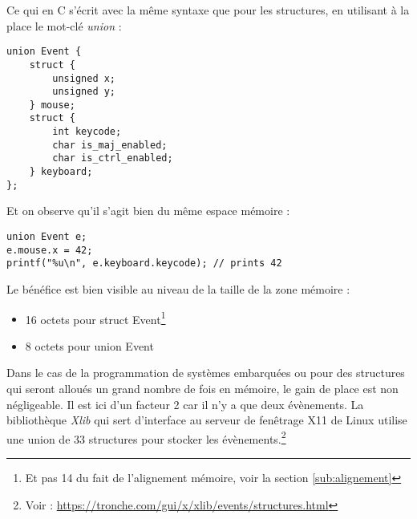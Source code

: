\documentclass[../../../main.tex]{subfiles}
\begin{document}
\begin{minipage}{\textwidth}
	\begin{center}
		
	\end{center}
\end{minipage}

Ce qui en C s’écrit avec la même syntaxe que pour les structures, en utilisant à la place le mot-clé
\textit{union} :
\begin{verbatim}
union Event {
	struct {
		unsigned x;
		unsigned y;
	} mouse;
	struct {
		int keycode;
		char is_maj_enabled;
		char is_ctrl_enabled;
	} keyboard;
};
\end{verbatim}
Et on observe qu’il s’agit bien du même espace mémoire :
\begin{verbatim}
union Event e;
e.mouse.x = 42;
printf("%u\n", e.keyboard.keycode); // prints 42
\end{verbatim}
Le bénéfice est bien visible au niveau de la taille de la zone mémoire :
\begin{itemize}
	\item 16 octets pour \textsf{struct Event}\footnote{Et pas 14 du fait de l’alignement mémoire, voir la section \ref{sub:alignement}}
	\item 8 octets pour \textsf{union Event}
\end{itemize}
Dans le cas de la programmation de systèmes embarquées ou pour des structures qui seront alloués un
grand nombre de fois en mémoire, le gain de place est non négligeable. Il est ici d’un facteur 2 car il
n’y a que deux évènements. La bibliothèque \textit{Xlib} qui sert d’interface au serveur de fenêtrage X11 de
Linux utilise une union de 33 structures pour stocker les évènements.\footnote{Voir : \url{https://tronche.com/gui/x/xlib/events/structures.html}}
\end{document}
